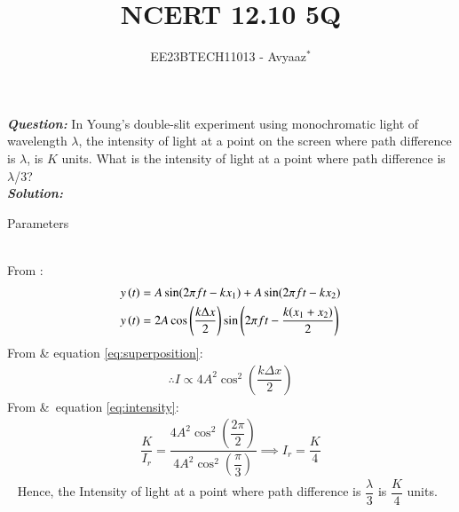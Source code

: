 \documentclass[journal,12pt,twocolumn]{IEEEtran}
\theoremstyle{remark}
\begin{document}

\vspace{3cm}

\title{NCERT 12.10 5Q}
\author{EE23BTECH11013 - Avyaaz$^{*}$%
}
\maketitle
\newpage
\bigskip

\renewcommand{\thefigure}{\theenumi}
\renewcommand{\thetable}{\arabic{table}}

\large\textbf{\textsl{Question:}}
In Young’s double-slit experiment using monochromatic light of wavelength $\lambda$, the intensity of light at a point on the screen where path difference is $\lambda$, is $K$ units. What is the intensity of light at a
point where path difference is $\lambda$/3?\\
\large\textbf{\textsl{Solution:}}
\begin{table}[htbp]
\setlength{\extrarowheight}{8pt}
\centering

\vspace{0.2cm}
\caption{Parameters}
\label{tab:parameters}
\end{table}\\
From :
\begin{align}
y\left(t\right) &= A\sin({2\pi f t - kx_1})  + A\sin({ 2\pi f t - kx_2}) \\
y\left(t\right) &=  2A\cos\left(\dfrac{k\Delta x}{2}\right)\sin\left(2\pi f t - \dfrac{k(x_1+x_2)}{2} \right) \label{eq:superposition}
\end{align}
From  \&  equation \eqref{eq:superposition}: 
\begin{align}
\therefore I \propto 4A^2\cos^2\left(\dfrac{k\Delta x}{2}\right)  \label{eq:intensity}
\end{align}
From  \& \,equation \eqref{eq:intensity}: 
\begin{align}
 \dfrac{K}{I_r} = \dfrac{4A^2\cos^2\left(\dfrac{2\pi}{2}\right)}{4A^2\cos^2\left(\dfrac{\pi}{3}\right)}
 \implies I_r = \dfrac{K}{4}
 \end{align}
\,\,\, Hence, the Intensity of light at a point where path difference is $\dfrac{\lambda}{3}$ is $\dfrac{K}{4}$ units.

\begin{table}[htbp]
\centering

\vspace{0.2cm}
\caption{}
\label{tab:parameters1}
\end{table}

\end{document}
